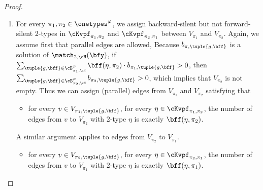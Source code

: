 \begin{proof}
\begin{enumerate}
        \item
            For every $\pi_1, \pi_2 \in \onetypes^\varphi$,
            we assign backward-silent but not forward-silent 2-types in $\cKvpf_{\pi_1, \pi_2}$ and $\cKvpf_{\pi_2, \pi_1}$
            between $V_{\pi_1}$ and $V_{\pi_2}$.
            Again, we assume first that parallel edges are allowed,
            Because $b_{\pi, \tuple{g, \bff}}$ is a solution of $\match_{2, \cH}(\bfy)$,
            if $\sum_{\tuple{g, \bff} \in \cB^\varphi_{\pi_1, \cH}} \bff(\eta, \pi_2) \cdot b_{\pi_1, \tuple{g, \bff}} > 0$,
            then $\sum_{\tuple{g, \bff} \in \cB^\varphi_{\pi_2, \cH}} b_{\pi_2, \tuple{g, \bff}} > 0$,
            which implies that $V_{\pi_2}$ is not empty.
            Thus we can assign (parallel) edges from $V_{\pi_1}$ and $V_{\pi_2}$ satisfying that
            \begin{itemize}
            \item
                for every $v \in V_{\pi_1, \tuple{g, \bff}}$, for every $\eta \in \cKvpf_{\pi_1, \pi_2}$,
                the number of edges from $v$ to $V_{\pi_2}$ with 2-type $\eta$ is exactly $\bff(\eta, \pi_2)$.
            \end{itemize}
            A similar argument applies to edges from $V_{\pi_2}$ to $V_{\pi_1}$.
            \begin{itemize}
            \item
                for every $v \in V_{\pi_2, \tuple{g, \bff}}$, for every $\eta \in \cKvpf_{\pi_2, \pi_1}$,
                the number of edges from $v$ to $V_{\pi_1}$ with 2-type $\eta$ is exactly $\bff(\eta, \pi_1)$.
            \end{itemize}


\end{enumerate}
\end{proof}
